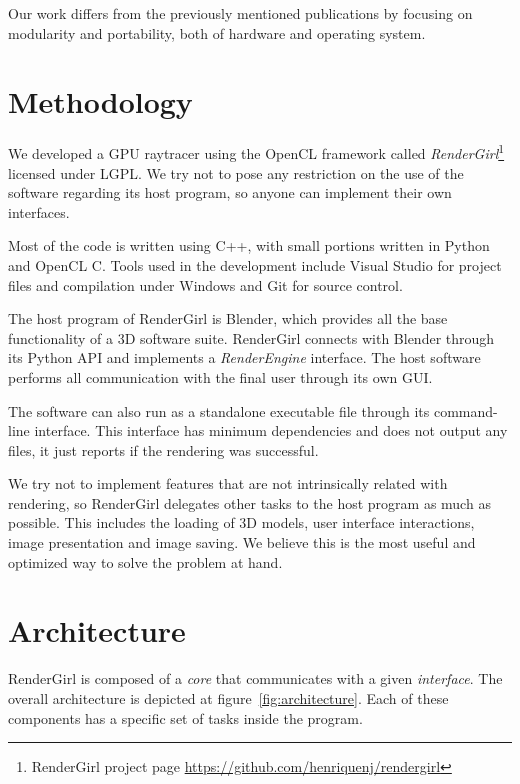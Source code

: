 \documentclass{vgtc}
\begin{document}
Our work differs from the previously mentioned publications by
focusing on modularity and portability, both of hardware and operating
system.

\section{Methodology}
\label{sec:methodology}

We developed a GPU raytracer using the OpenCL framework called
\emph{RenderGirl}\footnote{RenderGirl project page
  \url{https://github.com/henriquenj/rendergirl}} licensed under LGPL.
We try not to pose any restriction on the use of the software
regarding its host program, so anyone can implement their own
interfaces.

Most of the code is written using C++, with small portions
written in Python and OpenCL C. Tools used in the development include
Visual Studio for project files and compilation under Windows and Git
for source control.

The host program of RenderGirl is Blender, which provides all the base
functionality of a 3D software suite. RenderGirl connects with Blender
through its Python API and implements a \emph{RenderEngine}
interface. The host software performs all communication with the final
user through its own GUI.

The software can also run as a standalone executable file through its
command-line interface. This interface has minimum dependencies and
does not output any files, it just reports if the rendering was successful.

We try not to implement features that are not intrinsically related with
rendering, so RenderGirl delegates other tasks to the host program as
much as possible. This includes the loading of 3D models, user interface
interactions, image presentation and image saving. We believe this is the
most useful and optimized way to solve the problem at hand.

\section{Architecture}
\label{sec:architecture}

RenderGirl is composed of a \emph{core} that communicates with a given
\emph{interface}. The overall architecture is depicted at figure~\ref{fig:architecture}. Each of these components has a specific set
of tasks inside the program.
\end{document}
